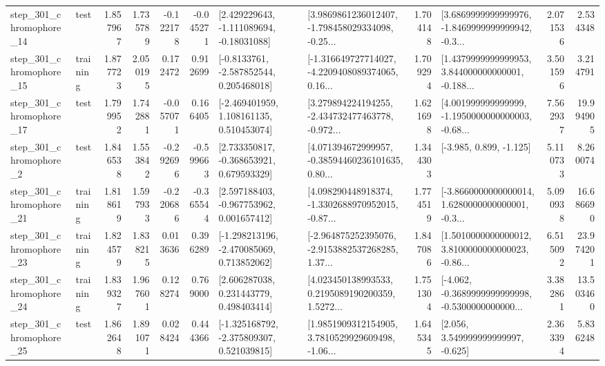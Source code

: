 \begin{tabular}{llrrrrllrlrr}
  step\_301\_chromophore\_14 &      test &      1.857967 &    1.735789 &     -0.122178 & -0.045271 &    [2.429229643, -1.111089694, -0.18031088] &  [3.9869861236012407, -1.798458029334098, -0.25... &       1.704148 &  [3.6869999999999976, -1.8469999999999942, -0.3... &            2.071536 &          2.534348 \\
  step\_301\_chromophore\_15 &  training &      1.877723 &    2.050195 &      0.172472 &  0.912699 &     [-0.8133761, -2.587852544, 0.205468018] &  [-1.316649727714027, -4.2209408089374065, 0.16... &       1.709294 &  [1.4379999999999953, 3.844000000000001, -0.188... &            3.501596 &          3.214791 \\
  step\_301\_chromophore\_17 &      test &      1.799952 &    1.742881 &     -0.057071 &  0.166405 &    [-2.469401959, 1.108161135, 0.510453074] &  [3.279894224194255, -2.434732477463778, -0.972... &       1.621698 &  [4.001999999999999, -1.1950000000000003, -0.68... &            7.562937 &         19.994905 \\
   step\_301\_chromophore\_2 &      test &      1.846538 &    1.553842 &     -0.292696 & -0.599663 &    [2.733350817, -0.368653921, 0.679593329] &  [4.071394672999957, -0.38594460236101635, 0.80... &       1.344303 &                            [-3.985, 0.899, -1.125] &            5.110733 &          8.260074 \\
  step\_301\_chromophore\_21 &  training &      1.818619 &    1.597933 &     -0.220686 & -0.365544 &    [2.597188403, -0.967753962, 0.001657412] &  [4.098290448918374, -1.3302688970952015, -0.87... &       1.774519 &  [-3.8660000000000014, 1.6280000000000001, -0.3... &            5.090938 &         16.686690 \\
  step\_301\_chromophore\_23 &  training &      1.824579 &    1.838215 &      0.013636 &  0.396289 &   [-1.298213196, -2.470085069, 0.713852062] &  [-2.964875252395076, -2.9153882537268285, 1.37... &       1.847086 &  [1.5010000000000012, 3.8100000000000023, -0.86... &            6.515092 &         23.974201 \\
  step\_301\_chromophore\_24 &  training &      1.839327 &    1.967601 &      0.128274 &  0.769000 &     [2.606287038, 0.231443779, 0.498403414] &  [4.023450138993533, 0.2195089190200359, 1.5272... &       1.751304 &  [-4.062, -0.3689999999999998, -0.5300000000000... &            3.382861 &         13.503460 \\
  step\_301\_chromophore\_25 &      test &      1.862648 &    1.891071 &      0.028424 &  0.444366 &   [-1.325168792, -2.375809307, 0.521039815] &  [1.9851909312154905, 3.7810529929609498, -1.06... &       1.645345 &                 [2.056, 3.549999999999997, -0.625] &            2.363394 &          5.836248 \\

\end{tabular}
